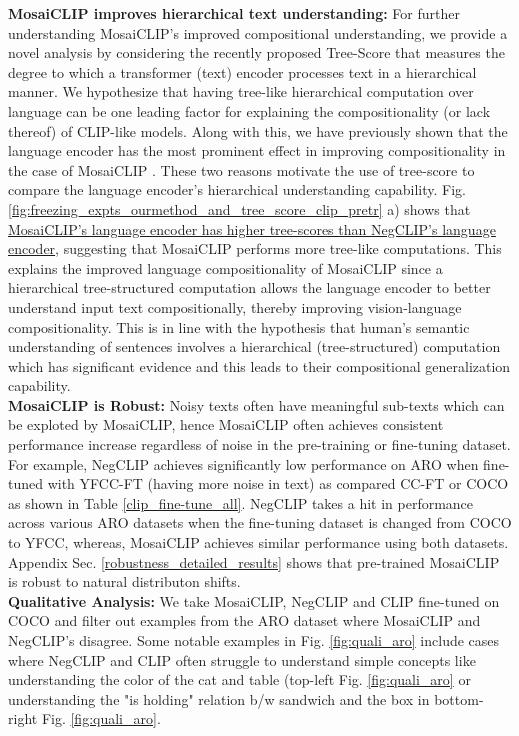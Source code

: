 \documentclass[11pt]{article}
\newcommand{\methodcomp}{MosaiCLIP}
\newcommand{\clip}{CLIP}
\newcommand{\negclip}{NegCLIP}
\begin{document}
\noindent\textbf{\methodcomp{} improves hierarchical text understanding:}
For further understanding \methodcomp{}'s improved compositional understanding, we provide a novel analysis by considering the recently proposed Tree-Score \citep{murty2022characterizing} that measures the degree to which a transformer (text) encoder processes text in a hierarchical manner. We hypothesize that having tree-like hierarchical computation over language can be one leading factor for explaining the compositionality (or lack thereof) of CLIP-like models. Along with this, we have previously shown that the language encoder has the most prominent effect in improving compositionality in the case of \methodcomp{} . These two reasons motivate the use of tree-score to compare the language encoder's hierarchical understanding capability. Fig. \ref{fig:freezing_expts_ourmethod_and_tree_score_clip_pretr} a) shows that \uline{\methodcomp{}'s language encoder has higher tree-scores than \negclip{}'s language encoder}, suggesting that \methodcomp{} performs more tree-like computations. This explains the improved language compositionality of \methodcomp{} since a hierarchical tree-structured computation allows the language encoder to better understand input text compositionally, thereby improving vision-language compositionality. This is in line with the hypothesis that human's semantic understanding of sentences involves a hierarchical (tree-structured) computation which has significant evidence \citep{crain,hale-etal-2018-finding,pallier2011cortical} and this leads to their compositional generalization capability.\\
\newline
\noindent \textbf{\methodcomp{} is Robust:}
Noisy texts often have meaningful sub-texts which can be exploted by \methodcomp{}, hence \methodcomp{} often achieves consistent performance increase regardless of noise in the pre-training or fine-tuning dataset. For example, \negclip{} achieves significantly low performance on ARO when fine-tuned with YFCC-FT (having more noise in text) as compared CC-FT or COCO as shown in Table \ref{clip_fine-tune_all}. \negclip{} takes a  hit in performance across various ARO datasets when the fine-tuning dataset is changed from COCO to YFCC, whereas, \methodcomp{} achieves similar performance using both datasets. Appendix Sec. \ref{robustness_detailed_results} shows that pre-trained MosaiCLIP is robust to natural distributon shifts.\\
\newline
\noindent \textbf{Qualitative Analysis:}
We take \methodcomp{}, \negclip{} and \clip{} fine-tuned on COCO and filter out examples from the ARO dataset where \methodcomp{} and \negclip{}'s disagree. Some notable examples in Fig. \ref{fig:quali_aro} include cases where \negclip{} and \clip{} often struggle to understand simple concepts like understanding the color of the cat and table ({top-left} Fig. \ref{fig:quali_aro} or understanding the "is holding" relation b/w sandwich and the box in {bottom-right} Fig. \ref{fig:quali_aro}.
\vspace{-0.3em}
\end{document}
